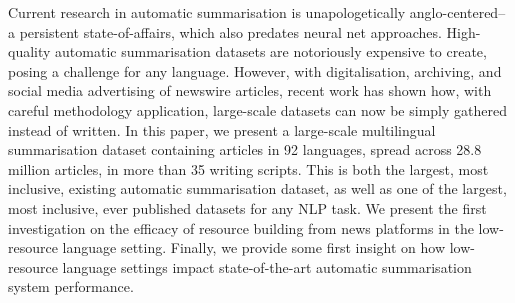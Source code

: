 Current research in automatic summarisation is unapologetically anglo-centered--a persistent state-of-affairs, which also predates neural net approaches.  High-quality automatic summarisation datasets are notoriously expensive to create, posing a challenge for any language.  However, with digitalisation, archiving, and social media advertising of newswire articles, recent work has shown how, with careful methodology application, large-scale datasets can now be simply gathered instead of written. In this paper, we present a large-scale multilingual summarisation dataset containing articles in 92 languages, spread across 28.8 million articles, in more than 35 writing scripts. This is both the largest, most inclusive, existing automatic summarisation dataset, as well as one of the largest, most inclusive, ever published datasets for any NLP task.  We present the first investigation on the efficacy of resource building from news platforms in the low-resource language setting.  Finally, we provide some first insight on how low-resource language settings impact state-of-the-art automatic summarisation system performance.
